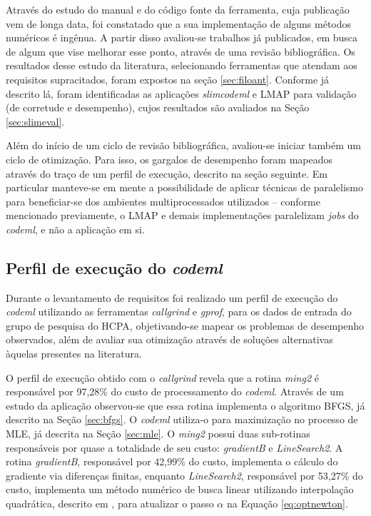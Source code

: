 \documentclass[cic,tc]{iiufrgs}
\begin{document}
Através do estudo do manual e do código fonte da ferramenta, cuja publicação
vem de longa data, foi constatado que a sua implementação de alguns métodos
numéricos é ingênua. A partir disso avaliou-se trabalhos já publicados, em
busca de algum que vise melhorar esse ponto, através de uma revisão
bibliográfica.  Os resultados desse estudo da literatura, selecionando
ferramentas que atendam aos requisitos supracitados, foram expostos na seção
\ref{sec:filoant}. Conforme já descrito lá, foram identificadas as aplicações
\textit{slimcodeml} e LMAP para validação (de corretude e desempenho), cujos
resultados são avaliados na Seção \ref{sec:slimeval}.

Além do início de um ciclo de revisão bibliográfica, avaliou-se iniciar também
um ciclo de otimização. Para isso, os gargalos de desempenho foram mapeados
através do traço de um perfil de execução, descrito na seção seguinte. Em
particular manteve-se em mente a possibilidade de aplicar técnicas de
paralelismo para beneficiar-se dos ambientes multiprocessados utilizados --
conforme mencionado previamente, o LMAP e demais implementações paralelizam
\textit{jobs} do \textit{codeml}, e não a aplicação em si. 

\subsection{Perfil de execução do \textit{codeml}}
\label{sec:codemlpar}

Durante o levantamento de requisitos foi realizado um perfil de execução do
\textit{codeml} utilizando as ferramentas \textit{callgrind} e \textit{gprof}, para os dados de
entrada do grupo de pesquisa do HCPA, objetivando-se mapear os problemas de
desempenho observados, além de avaliar sua otimização através de soluções
alternativas àquelas presentes na literatura.

O perfil de execução obtido com o \textit{callgrind} revela que a rotina \textit{ming2}
é responsável por 97,28\% do custo de processamento do \textit{codeml}. Através de um
estudo da aplicação observou-se que essa rotina implementa o algoritmo BFGS,
já descrito na Seção \ref{sec:bfgs}. O \textit{codeml} utiliza-o para maximização no
processo de MLE, já descrita na Seção \ref{sec:mle}. O \textit{ming2} possui duas
sub-rotinas responsáveis por quase a totalidade de seu custo:
\textit{gradientB} e \textit{LineSearch2}. A rotina \textit{gradientB},
responsável por 42,99\% do custo, implementa o cálculo do gradiente via
diferenças finitas, enquanto \textit{LineSearch2}, responsável por 53,27\% do
custo, implementa um método numérico de busca linear utilizando interpolação
quadrática, descrito em \cite{wolfe1978numerical}, para atualizar o passo
$\alpha$ na Equação \ref{eq:optnewton}.
\end{document}
